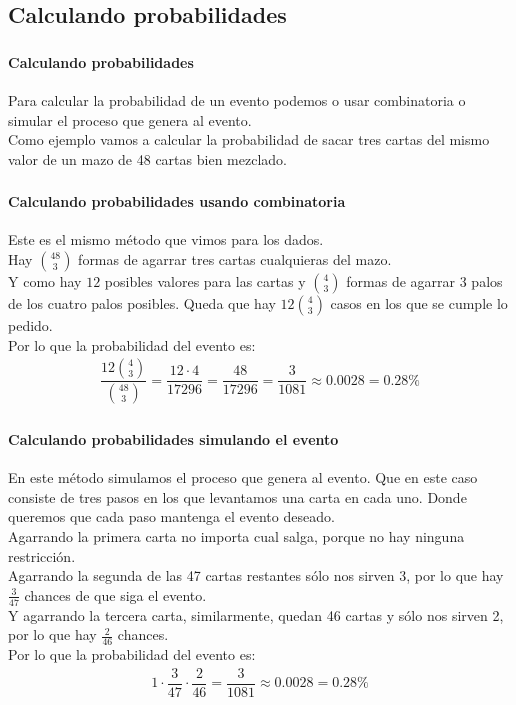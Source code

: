 \documentclass[../main.tex]{subfiles}
\begin{document}
\subsection{Calculando probabilidades}

\begin{frame}
  \frametitle{\SECTIONA}
  \framesubtitle{Calculando probabilidades}

  Para calcular la probabilidad de un evento podemos o usar combinatoria o simular el proceso que genera al evento. \pause \\
  Como ejemplo vamos a calcular la probabilidad de sacar tres cartas del mismo valor de un mazo de 48 cartas bien mezclado.
\end{frame}

\begin{frame}
  \frametitle{\SECTIONA}
  \framesubtitle{Calculando probabilidades usando combinatoria}

  Este es el mismo método que vimos para los dados. \pause \\
  Hay \(\binom{48}{3}\) formas de agarrar tres cartas cualquieras del mazo. \pause \\
  Y como hay \(12\) posibles valores para las cartas y \(\binom{4}{3}\) formas de agarrar 3 palos de los cuatro palos posibles. Queda que hay \(12\binom{4}{3}\) casos en los que se cumple lo pedido. \pause \\
  Por lo que la probabilidad del evento es:
  \begin{gather*}
    \dfrac{12\binom{4}{3}}{\binom{48}{3}} = \dfrac{12 \cdot 4}{17296} = \dfrac{48}{17296} = \dfrac{3}{1081} \approx 0.0028 = 0.28\%
  \end{gather*}
\end{frame}

\begin{frame}
  \frametitle{\SECTIONA}
  \framesubtitle{Calculando probabilidades simulando el evento}

  En este método simulamos el proceso que genera al evento. \pause Que en este caso consiste de tres pasos en los que levantamos una carta en cada uno. Donde queremos que cada paso mantenga el evento deseado. \pause \\
  Agarrando la primera carta no importa cual salga, porque no hay ninguna restricción. \pause \\
  Agarrando la segunda de las 47 cartas restantes sólo nos sirven 3, por lo que hay \(\frac{3}{47}\) chances de que siga el evento. \pause \\
  Y agarrando la tercera carta, similarmente, quedan 46 cartas y sólo nos sirven 2, por lo que hay \(\frac{2}{46}\) chances. \pause \\ Por lo que la probabilidad del evento es:
  \begin{gather*}
    1 \cdot \dfrac{3}{47} \cdot \dfrac{2}{46} = \dfrac{3}{1081} \approx 0.0028 = 0.28\%
  \end{gather*}
\end{frame}
\end{document}
